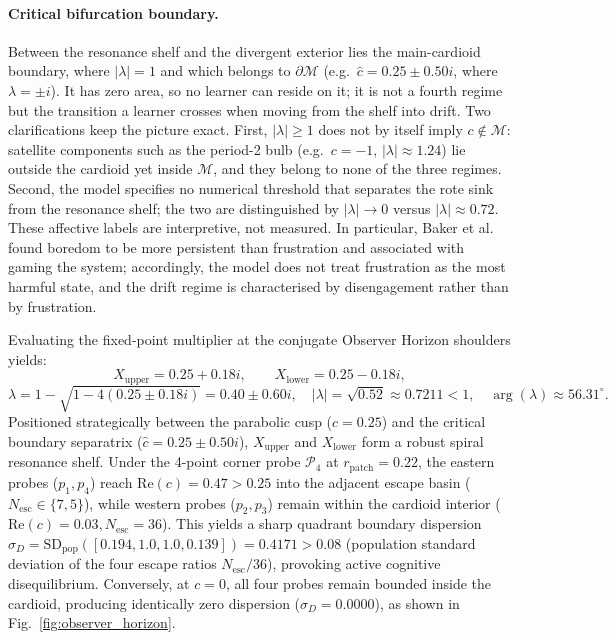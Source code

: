 \documentclass[10pt,twocolumn,a4paper]{article}
\begin{document}
\paragraph{Critical bifurcation boundary.} Between the resonance shelf and the divergent exterior lies the main-cardioid boundary, where $|\lambda| = 1$ and which belongs to $\partial\mathcal{M}$ (e.g.\ $\hat{c} = 0.25 \pm 0.50i$, where $\lambda = \pm i$). It has zero area, so no learner can reside on it; it is not a fourth regime but the transition a learner crosses when moving from the shelf into drift. Two clarifications keep the picture exact. First, $|\lambda| \ge 1$ does not by itself imply $c \notin \mathcal{M}$: satellite components such as the period-2 bulb (e.g.\ $c = -1$, $|\lambda| \approx 1.24$) lie outside the cardioid yet inside $\mathcal{M}$, and they belong to none of the three regimes. Second, the model specifies no numerical threshold that separates the rote sink from the resonance shelf; the two are distinguished by $|\lambda| \to 0$ versus $|\lambda| \approx 0.72$.
These affective labels are interpretive, not measured. In particular, Baker et al.\ \cite{baker2010better} found boredom to be more persistent than frustration and associated with gaming the system; accordingly, the model does not treat frustration as the most harmful state, and the drift regime is characterised by disengagement rather than by frustration.

Evaluating the fixed-point multiplier at the conjugate Observer Horizon shoulders yields:
\begin{equation}
    X_{\text{upper}} = 0.25 + 0.18i, \qquad X_{\text{lower}} = 0.25 - 0.18i,
    \label{eq:shoulders}
\end{equation}
\begin{equation}
    \lambda = 1 - \sqrt{1 - 4(0.25 \pm 0.18i)} = 0.40 \pm 0.60i, \quad |\lambda| = \sqrt{0.52} \approx 0.7211 < 1, \quad \arg(\lambda) \approx 56.31^\circ.
    \label{eq:lambda_shoulder}
\end{equation}
Positioned strategically between the parabolic cusp ($c = 0.25$) and the critical boundary separatrix ($\hat{c} = 0.25 \pm 0.50i$), $X_{\text{upper}}$ and $X_{\text{lower}}$ form a robust spiral resonance shelf. Under the 4-point corner probe $\mathcal{P}_4$ at $r_{\text{patch}} = 0.22$, the eastern probes ($p_1, p_4$) reach $\text{Re}(c) = 0.47 > 0.25$ into the adjacent escape basin ($N_{\text{esc}} \in \{7, 5\}$), while western probes ($p_2, p_3$) remain within the cardioid interior ($\text{Re}(c) = 0.03, N_{\text{esc}} = 36$). This yields a sharp quadrant boundary dispersion $\sigma_D = \text{SD}_{\text{pop}}([0.194, 1.0, 1.0, 0.139]) = 0.4171 > 0.08$ (population standard deviation of the four escape ratios $N_{\text{esc}}/36$), provoking active cognitive disequilibrium. Conversely, at $c = 0$, all four probes remain bounded inside the cardioid, producing identically zero dispersion ($\sigma_D = 0.0000$), as shown in Fig.~\ref{fig:observer_horizon}.
\end{document}

